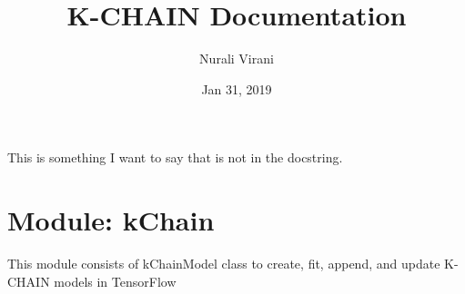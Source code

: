 \documentclass[letterpaper,10pt,english]{sphinxmanual}
\title{K-CHAIN Documentation}
\date{Jan 31, 2019}
\author{Nurali Virani}
\begin{document}
\pagestyle{empty}
\maketitle
\pagestyle{plain}
\sphinxtableofcontents
\pagestyle{normal}
\label{\detokenize{index::doc}}


This is something I want to say that is not in the docstring.


\chapter{Module: kChain}
\label{\detokenize{index:module-kChain}}\label{\detokenize{index:module-kchain}}
This module consists of kChainModel class to create, fit, append, and update
K-CHAIN models in TensorFlow
\end{document}

